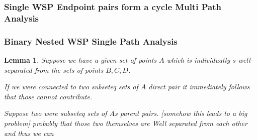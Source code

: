 \documentclass{article}
\newtheorem{lem}[thm]{Lemma}
\theoremstyle{definition}
\begin{document}














\subsubsection{Single WSP Endpoint pairs form a cycle Multi Path Analysis}







\subsubsection{Binary Nested WSP Single Path Analysis}

\begin{lem} %
    Suppose we have a given set of points $A$ which is individually $s$-well-separated from the sets of points $B,C,D$.
    
    If we were connected to two subseteq sets of $A$ direct pair it immediately follows that those cannot contribute.

    Suppose two were subseteq sets of $A$s parent pairs. [somehow this leads to a big problem] probably that those two themselves are Well separated from each other and thus we can 
\end{lem}
\end{document}

